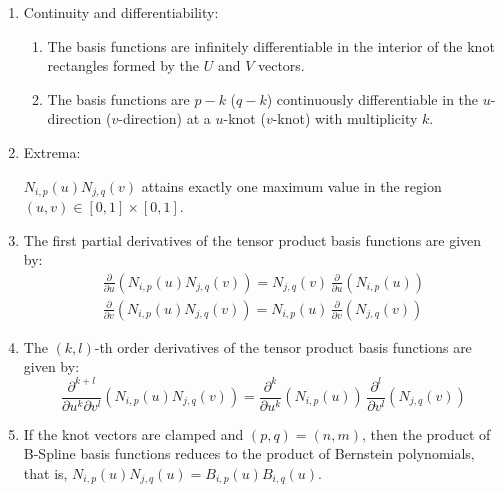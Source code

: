 \begin{enumerate}
        In addition, for an arbitrary knot rectangle, $[u_{i_{0}}, u_{i_{0}+1}) \times [v_{j_{0}}, v_{j_{0}+1})$ we have that:
            \begin{equation*}
                \sum_{i=i_{0}-p}^{i_{0}}\sum_{j=j_{0}-q}^{j_{0}} N_{i,p}(u) N_{j,q}(v) = 1 \text{ for all } (u,v) \in [u_{i_{0}}, u_{i_{0}+1}) \times [v_{j_{0}}, v_{j_{0}+1})
            \end{equation*}
        This means that the sum of the non-zero basis-functions of any knot rectangle is unity.
        
    \item Continuity and differentiability:
    \begin{enumerate}
        \item The basis functions are infinitely differentiable in the interior of the knot rectangles formed by the $U$ and $V$ vectors.
        \item The basis functions are $p-k$ ($q-k$) continuously differentiable in the $u$-direction ($v$-direction) at a $u$-knot ($v$-knot) with multiplicity $k$.
    \end{enumerate}

    \item Extrema:
    
    $N_{i,p}(u)N_{j,q}(v)$ attains exactly one maximum value in the region $(u,v) \in [0, 1] \times [0, 1]$.
    
    \item The first partial derivatives of the tensor product basis functions are given by:
        \begin{align*}
        \frac{\partial}{\partial u} \left( N_{i,p}(u)N_{j,q}(v) \right) = N_{j,q}(v) \, \frac{\partial}{\partial u} \left(N_{i,p}(u)\right) \\
            \frac{\partial}{\partial v} \left(N_{i,p}(u)N_{j,q}(v) \right) = N_{i,p}(u) \, \frac{\partial}{\partial v} \left(N_{j,q}(v)\right)
        \end{align*}

    \item The $(k,l)$-th order derivatives of the tensor product basis functions are given by:
        \begin{equation*}
            \frac{\partial^{k+l}}{\partial u^{k} \partial v^{l}} \left( N_{i,p}(u)N_{j,q}(v) \right) = \frac{\partial^k}{\partial u^k} \left(N_{i,p}(u)\right) \,
            \frac{\partial^l}{\partial v^l} \left(N_{j,q}(v)\right)
        \end{equation*}
    
    \item If the knot vectors are clamped and $(p,q)=(n,m)$, then the product of B-Spline basis functions reduces to the product of Bernstein polynomials, that is, $N_{i,p}(u)N_{j,q}(u)=B_{i,p}(u)B_{i,q}(u)$.

    
\end{enumerate}




